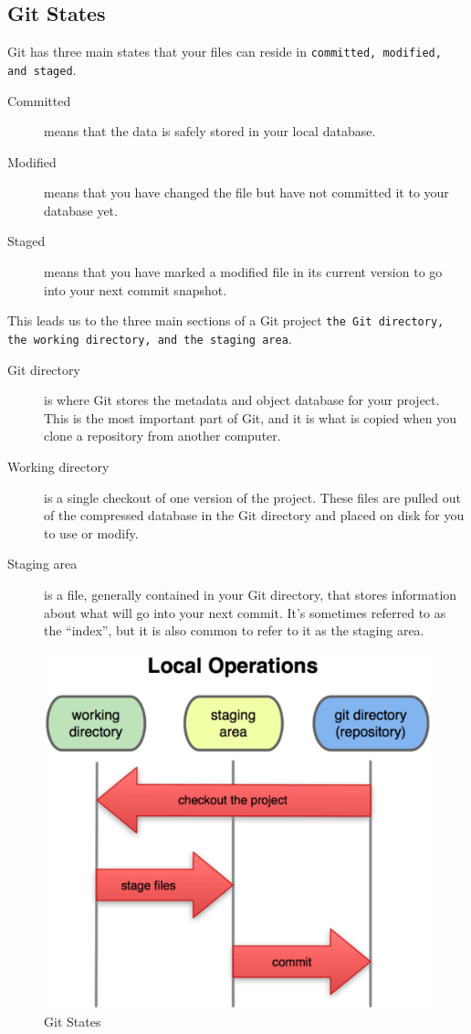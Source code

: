 \documentclass[11pt,a4paper]{article}
\begin{document}
\subsection*{Git States}
Git has three main states that your files can reside in \texttt{committed, modified, and staged}. 
\begin{description}
\item [Committed] means that the data is safely stored in your local database.
\item [Modified] means that you have changed the file but have not committed it to your database yet. 
\item [Staged]  means that you have marked a modified file in its current version to go into your next commit snapshot.
\end{description}

This leads us to the three main sections of a Git project \texttt{the Git directory, the working directory, and the staging area}.
\begin{description}
\item [Git directory] is where Git stores the metadata and object database for your project. This is the most important part of Git, and it is what is copied when you clone a repository from another computer.
\item [Working directory] is a single checkout of one version of the project. These files are pulled out of the compressed database in the Git directory and placed on disk for you to use or modify.

\item [Staging area] is a file, generally contained in your Git directory, that stores information about what will go into your next commit. It's sometimes referred to as the ``index'', but it is also common to refer to it as the staging area.
\end{description}
\begin{figure}[H]
\begin{center}
\includegraphics[scale=0.4]{git-states.png}
\caption{Git States}
\label{Git States}\end{center}
\end{figure}
\end{document}
